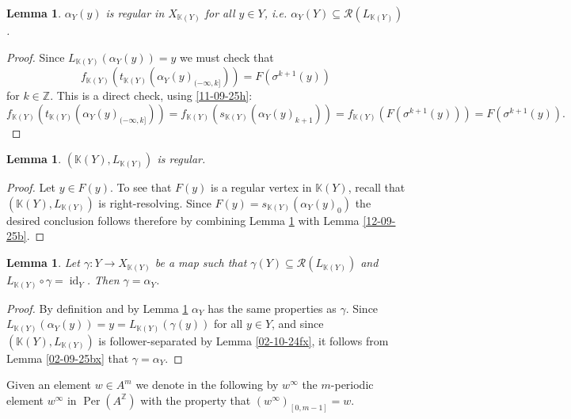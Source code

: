 \documentclass[12pt,oneside,english]{amsart}
\newcommand{\id}{\operatorname{id}}
\newcommand{\Per}{\operatorname{Per}}
\newtheorem{lemma}[thm]{Lemma}
\begin{document}
\begin{lemma}\label{11-09-25g} $\alpha_Y(y)$ is regular in $X_{\mathbb K(Y)}$ for all $y \in Y$, i.e.
$\alpha_Y(Y) \subseteq \mathcal R(L_{\mathbb K(Y)})$.
\end{lemma}
\begin{proof} Since $L_{\mathbb K(Y)}(\alpha_Y(y)) = y$ we must check that
$$
f_{\mathbb K(Y)}\left(t_{\mathbb K(Y)}(\alpha_Y(y)_{(-\infty,k]})\right) = F(\sigma^{k+1}(y))
$$
for $k \in \mathbb Z$. This is a direct check, using \eqref{11-09-25h}: 
$$f_{\mathbb K(Y)}\left(t_{\mathbb K(Y)}(\alpha_Y(y)_{(-\infty,k]})\right) = f_{\mathbb K(Y)}\left(s_{\mathbb K(Y)}(\alpha_Y(y)_{k+1})\right)  = f_{\mathbb K(Y)}(F(\sigma^{k+1}(y))) = F(\sigma^{k+1}(y)).
$$
\end{proof}

\begin{lemma}\label{04-09-25h} $(\mathbb K(Y),L_{\mathbb K(Y)})$ is regular.
\end{lemma}
\begin{proof}  Let $y \in F(y)$. To see that $F(y)$ is a regular vertex in $\mathbb K(Y)$, recall that $(\mathbb K(Y),L_{\mathbb K(Y)})$ is right-resolving. Since $F(y) = s_{\mathbb K(Y)}(\alpha_Y(y)_0)$ the desired conclusion follows therefore by combining Lemma \ref{11-09-25g} with Lemma \ref{12-09-25b}.
\end{proof}




\begin{lemma}\label{12-09-25j} Let $\gamma : Y \to X_{\mathbb K(Y)}$ be a map such that $\gamma(Y) \subseteq \mathcal R(L_{\mathbb K(Y)})$ and $L_{\mathbb K(Y)}\circ \gamma =\id_Y$.  Then $\gamma = \alpha_Y$.   
\end{lemma}
\begin{proof} By definition and by Lemma \ref{11-09-25g} $\alpha_Y$ has the same properties as $\gamma$. Since $L_{\mathbb K(Y)}(\alpha_Y(y)) = y = L_{\mathbb K(Y)}(\gamma(y))$ for all $y \in Y$, and since $(\mathbb K(Y),L_{\mathbb K(Y)})$ is follower-separated by Lemma \ref{02-10-24fx}, it follows from Lemma \ref{02-09-25bx} that $\gamma = \alpha_Y$.
\end{proof}  



Given an element $w \in A^m$ we denote in the following by $w^\infty$ the $m$-periodic element $w^\infty$ in $\Per(A^\mathbb Z)$ with the property that $(w^\infty)_{[0,m-1]} = w$.
\end{document}
